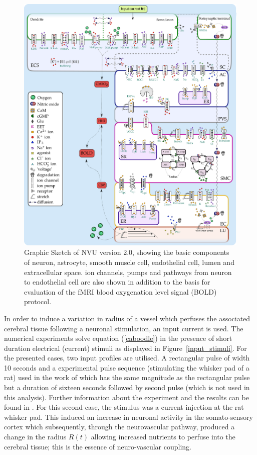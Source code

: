 \begin{figure}[h!]
\centering
\includegraphics[width=0.7\linewidth]{Figures/nvu_20}
\caption[Graphic Sketch of NVU version 2.0]{Graphic Sketch of NVU version 2.0, showing the basic components of neuron, astrocyte, smooth muscle cell, endothelial cell, lumen and extracellular space. ion channels, pumps and pathways from neuron to endothelial cell are also shown in addition to the basis for evaluation of the fMRI blood oxygenation level signal (BOLD) protocol.}
\label{fig:nvu20}
\end{figure}

In order to induce a variation in radius of a vessel which perfuses the associated cerebral tissue following a neuronal stimulation, an input current is used. The numerical experiments solve equation (\ref{caboodle}) in the presence of short duration electrical (current) stimuli as displayed in Figure~\ref{input_stimuli}. For the presented cases, two input profiles are utilised. A rectangular pulse of width 10 seconds and a experimental pulse sequence (stimulating the whisker pad of a rat) used in the work of \cite{Zheng2010} which has the same magnitude as the rectangular pulse but a duration of sixteen seconds followed by second pulse (which is not used in this analysis). Further information about the experiment and the results can be found in \cite{Zheng2010}.  For this second case, the stimulus was a current injection at the rat whisker pad. This induced an increase in neuronal activity in the somato-sensory cortex which subsequently, through the neurovascular pathway, produced a  change in the radius $R(t)$ allowing increased nutrients to perfuse into the cerebral tissue; this is  the essence of neuro-vascular coupling. 


